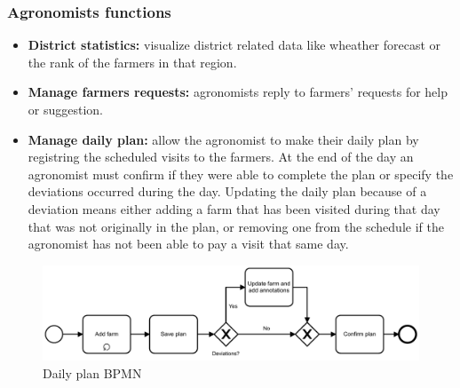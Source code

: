 \documentclass[table, 12pt]{article}
\begin{document}
\subsubsection{Agronomists functions}
\begin{itemize}
    \item \textbf{District statistics:} visualize district related data like wheather forecast or the rank of the farmers in that region.
    \item \textbf{Manage farmers requests:} agronomists reply to farmers' requests for help or suggestion.
    \item \textbf{Manage daily plan:} allow the agronomist to make their daily plan by registring the scheduled visits to the farmers. At the end of the day an agronomist must confirm if they were able to complete the plan or specify the deviations occurred during the day. Updating the daily plan because of a deviation means either adding a farm that has been visited during that day that was not originally in the plan, or removing one from the schedule if the agronomist has not been able to pay a visit that same day.  
\end{itemize}
\begin{center}
    \begin{figure}[H]
        \includegraphics[width=\textwidth]{assets/BPMN/DailyPlanBpmn}
        \caption{Daily plan BPMN}
        \label{fig: dailyplan}
    \end{figure}
\end{center}
\end{document}
